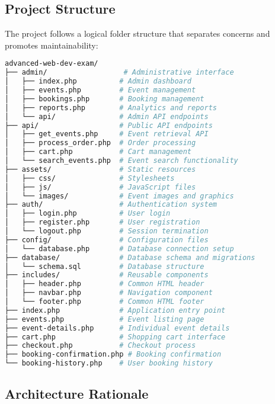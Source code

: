 \documentclass[12pt,a4paper]{article}
\begin{document}
\subsection{Project Structure}

The project follows a logical folder structure that separates concerns and promotes maintainability:

\begin{lstlisting}[language=bash, caption=Project Directory Structure]
advanced-web-dev-exam/
├── admin/                  # Administrative interface
│   ├── index.php          # Admin dashboard
│   ├── events.php         # Event management
│   ├── bookings.php       # Booking management
│   ├── reports.php        # Analytics and reports
│   └── api/               # Admin API endpoints
├── api/                   # Public API endpoints
│   ├── get_events.php     # Event retrieval API
│   ├── process_order.php  # Order processing
│   ├── cart.php           # Cart management
│   └── search_events.php  # Event search functionality
├── assets/                # Static resources
│   ├── css/               # Stylesheets
│   ├── js/                # JavaScript files
│   └── images/            # Event images and graphics
├── auth/                  # Authentication system
│   ├── login.php          # User login
│   ├── register.php       # User registration
│   └── logout.php         # Session termination
├── config/                # Configuration files
│   └── database.php       # Database connection setup
├── database/              # Database schema and migrations
│   └── schema.sql         # Database structure
├── includes/              # Reusable components
│   ├── header.php         # Common HTML header
│   ├── navbar.php         # Navigation component
│   └── footer.php         # Common HTML footer
├── index.php              # Application entry point
├── events.php             # Event listing page
├── event-details.php      # Individual event details
├── cart.php               # Shopping cart interface
├── checkout.php           # Checkout process
├── booking-confirmation.php # Booking confirmation
└── booking-history.php    # User booking history
\end{lstlisting}

\subsection{Architecture Rationale}
\end{document}
